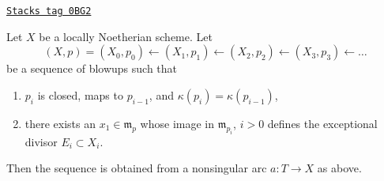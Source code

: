 \begin{lemma}
\label{resolve-lemma-sequence-blowups}
\href{https://stacks.math.columbia.edu/tag/0BG2}{\texttt{Stacks tag 0BG2}}

Let $X$ be a locally Noetherian scheme. Let
$$
(X, p) = (X_0, p_0) \leftarrow (X_1, p_1) \leftarrow (X_2, p_2) \leftarrow
(X_3, p_3) \leftarrow \ldots
$$
be a sequence of blowups such that
\begin{enumerate}
\item $p_i$ is closed, maps to $p_{i - 1}$, and
$\kappa(p_i) = \kappa(p_{i - 1})$,
\item there exists an $x_1 \in \mathfrak m_p$ whose image
in $\mathfrak m_{p_i}$, $i > 0$ defines the exceptional divisor
$E_i \subset X_i$.
\end{enumerate}
Then the sequence is obtained from a nonsingular arc $a : T \to X$
as above.
\end{lemma}


